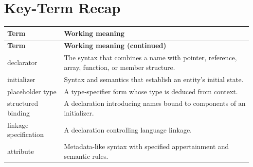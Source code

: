 \documentclass[11pt,letterpaper]{article}
\begin{document}
\section{Key-Term Recap}
\begin{longtable}{@{}>{\RaggedRight\arraybackslash}p{}>{\RaggedRight\arraybackslash}p{}@{}}\toprule\textbf{Term} & \textbf{Working meaning}\\\midrule\endfirsthead\toprule\textbf{Term} & \textbf{Working meaning (continued)}\\\midrule\endhead\bottomrule\endfoot
declarator & The syntax that combines a name with pointer, reference, array, function, or member structure.\\
initializer & Syntax and semantics that establish an entity's initial state.\\
placeholder type & A type-specifier form whose type is deduced from context.\\
structured binding & A declaration introducing names bound to components of an initializer.\\
linkage specification & A declaration controlling language linkage.\\
attribute & Metadata-like syntax with specified appertainment and semantic rules.\\
\end{longtable}
\end{document}
